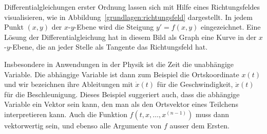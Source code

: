 Differentialgleichungen erster Ordnung lassen sich mit Hilfe eines
Richtungsfeldes visualisieren, wie in Abbildung~\ref{grundlagen:richtungsfeld}
dargestellt.
%
In jedem Punkt $(x,y)$ der $x$-$y$-Ebene wird die Steigung $y'=f(x,y)$
eingezeichnet.
Eine Lösung der Differentialgleichung hat in diesem Bild als Graph
eine Kurve in der $x$-$y$-Ebene, die an jeder Stelle als Tangente 
das Richtungsfeld hat.

Insbesondere in Anwendungen in der Physik ist die Zeit die
unabhängige Variable.
Die abhängige Variable ist dann zum Beispiel die Ortskoordinate
$x(t)$ und wir bezeichnen ihre Ableitungen mit $\dot{x}(t)$ für
die Geschwindigkeit, $\ddot{x}(t)$ für die Beschleunigung.
Dieses Beispiel suggeriert auch, dass die abhängige Variable 
ein Vektor sein kann, den man als den Ortsvektor eines Teilchens
interpretieren kann.
%
%
%
Auch die Funktion $f(t,x,\dots,x^{(n-1)})$ muss dann vektorwertig sein, und
ebenso alle Argumente von $f$ ausser dem Ersten.

